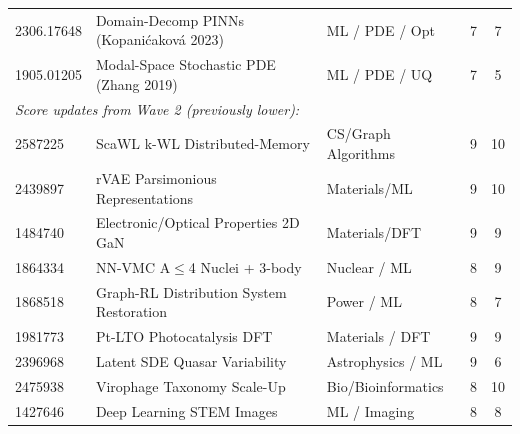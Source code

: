 \documentclass[11pt]{article}
\begin{document}
\begin{longtable}{lllcc}
2306.17648 & Domain-Decomp PINNs (Kopani\'cakov\'a 2023) & ML / PDE / Opt & 7 & 7 \\
1905.01205 & Modal-Space Stochastic PDE (Zhang 2019) & ML / PDE / UQ & 7 & 5 \\
\midrule
\multicolumn{3}{l}{\textit{Score updates from Wave 2 (previously lower):}} & & \\
2587225 & ScaWL k-WL Distributed-Memory & CS/Graph Algorithms & 9 & 10 \\
2439897 & rVAE Parsimonious Representations & Materials/ML & 9 & 10 \\
1484740 & Electronic/Optical Properties 2D GaN & Materials/DFT & 9 & 9 \\
1864334 & NN-VMC A$\leq$4 Nuclei + 3-body & Nuclear / ML & 8 & 9 \\
1868518 & Graph-RL Distribution System Restoration & Power / ML & 8 & 7 \\
1981773 & Pt-LTO Photocatalysis DFT & Materials / DFT & 9 & 9 \\
2396968 & Latent SDE Quasar Variability & Astrophysics / ML & 9 & 6 \\
2475938 & Virophage Taxonomy Scale-Up & Bio/Bioinformatics & 8 & 10 \\
1427646 & Deep Learning STEM Images & ML / Imaging & 8 & 8 \\
\bottomrule\end{longtable}
\end{document}
